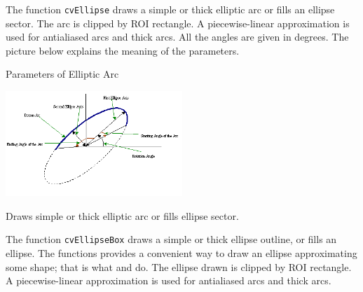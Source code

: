 The function \texttt{cvEllipse} draws a simple or thick elliptic
arc or fills an ellipse sector. The arc is clipped by ROI rectangle.
A piecewise-linear approximation is used for antialiased arcs and
thick arcs. All the angles are given in degrees. The picture below
explains the meaning of the parameters.

Parameters of Elliptic Arc

\includegraphics[width=0.5\textwidth]{pics/ellipse.png}


Draws simple or thick elliptic arc or fills ellipse sector.


\begin{description}
\end{description}

The function \texttt{cvEllipseBox} draws a simple or thick ellipse outline, or fills an ellipse. The functions provides a convenient way to draw an ellipse approximating some shape; that is what  and  do. The ellipse drawn is clipped by ROI rectangle. A piecewise-linear approximation is used for antialiased arcs and thick arcs.

\label{FillPoly}

